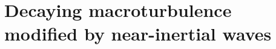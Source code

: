 \documentclass{jfm}
\newcommand{\NIW}{near-inertial wave}
\begin{document}
%
%
%



\section{Decaying macroturbulence modified by \NIW s}\label{turbulence}
\end{document}
